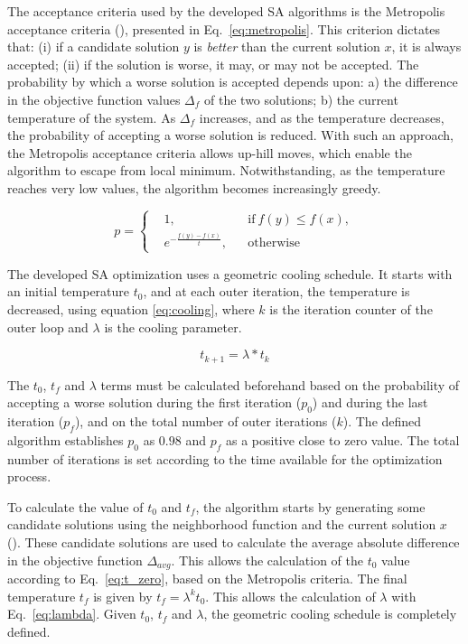 \documentclass[onecolumn]{elsarticle}
\begin{document}
The acceptance criteria used by the developed SA algorithms is the Metropolis acceptance criteria (\cite{metropolis}), presented in Eq.~\ref{eq:metropolis}. This criterion dictates that: (i) if a candidate solution $y$ is \textit{better} than the current solution $x$, it is always accepted; (ii) if the solution is worse, it may, or may not be accepted. The probability by which a worse solution is accepted depends upon: a) the difference in the objective function values $\Delta_f$ of the two solutions; b) the current temperature of the system. As $\Delta_f$ increases, and as the temperature decreases, the probability of accepting a worse solution is reduced. With such an approach, the Metropolis acceptance criteria allows up-hill moves, which enable the algorithm to escape from local minimum. Notwithstanding, as the temperature reaches very low values, the algorithm becomes increasingly greedy.

\begin{equation}
\label{eq:metropolis}
  p =  \left \{
  \begin{aligned}
    & 1, && \text{if}\ f(y) \leq f(x),\\
    & e^{-\frac{f(y)-f(x)}{t}},&& \text{otherwise}
  \end{aligned} \right. 
\end{equation}

The developed SA optimization uses a geometric cooling schedule. It starts with an initial temperature $t_0$, and at each outer iteration, the temperature is decreased, using equation \ref{eq:cooling}, where $k$ is the iteration counter of the outer loop and $\lambda$ is the cooling parameter. 

\begin{equation}
    \label{eq:cooling}
     t_{k+1} = \lambda * t_{k}
\end{equation}

The $t_0$, $t_f$ and $\lambda$ terms must be calculated beforehand based on the probability of accepting a worse solution during the first iteration ($p_0$) and during the last iteration ($p_f$), and on the total number of outer iterations ($k$). The defined algorithm establishes $p_0$ as $0.98$ and $p_f$ as a positive close to zero value. The total number of iterations is set according to the time available for the optimization process. 

To calculate the value of $t_0$ and $t_f$, the algorithm starts by generating some candidate solutions using the neighborhood function and the current solution $x$ (\cite{SA_methods}). These candidate solutions are used to calculate the average absolute difference in the objective function $\Delta_{avg}$. This allows the calculation of the  $t_0$ value according to Eq.~\ref{eq:t_zero}, based on the Metropolis criteria. The final temperature $t_f$ is given by $t_f = \lambda^{k}t_0$. This allows the calculation of $\lambda$ with Eq.~\ref{eq:lambda}. Given $t_0$, $t_f$ and $\lambda$, the geometric cooling schedule is completely defined.
\end{document}
